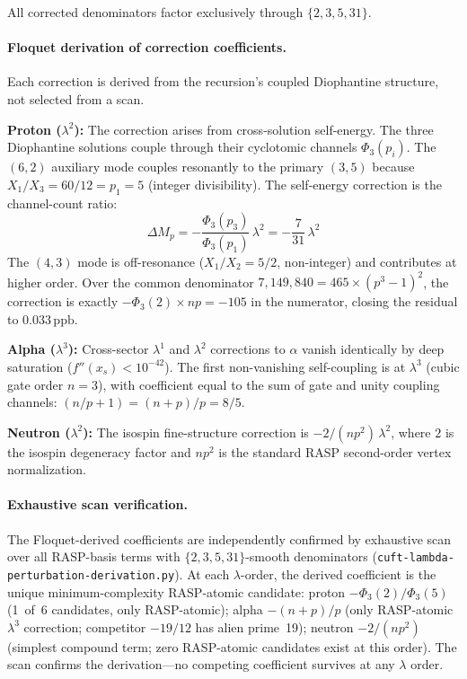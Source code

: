 \documentclass[12pt,a4paper]{article}
\theoremstyle{definition}
\newcommand{\Phithree}{\Phi_3}
\newcommand{\ppb}{\,\mathrm{ppb}}
\begin{document}
All corrected denominators factor exclusively through $\{2, 3, 5, 31\}$.

\paragraph{Floquet derivation of correction coefficients.}
Each correction is derived from the recursion's coupled Diophantine
structure, not selected from a scan.

\textbf{Proton ($\lambda^2$):} The correction arises from cross-solution
self-energy. The three Diophantine solutions couple through their
cyclotomic channels $\Phithree(p_i)$. The $(6,2)$ auxiliary mode
couples resonantly to the primary $(3,5)$ because
$X_1/X_3 = 60/12 = p_1 = 5$ (integer divisibility). The self-energy
correction is the channel-count ratio:
\[
  \Delta M_p = -\frac{\Phithree(p_3)}{\Phithree(p_1)}\,\lambda^2
  = -\frac{7}{31}\,\lambda^2
\]
The $(4,3)$ mode is off-resonance ($X_1/X_2 = 5/2$, non-integer) and
contributes at higher order. Over the common denominator $7{,}149{,}840
= 465 \times (p^3{-}1)^2$, the correction is exactly
$-\Phithree(2) \times np = -105$ in the numerator, closing the residual
to $0.033\ppb$.

\textbf{Alpha ($\lambda^3$):} Cross-sector $\lambda^1$ and $\lambda^2$
corrections to $\alpha$ vanish identically by deep saturation
($f''(x_s) < 10^{-42}$). The first non-vanishing self-coupling is at
$\lambda^3$ (cubic gate order $n = 3$), with coefficient equal to the
sum of gate and unity coupling channels:
$(n/p + 1) = (n{+}p)/p = 8/5$.

\textbf{Neutron ($\lambda^2$):} The isospin fine-structure correction is
$-2/(np^2)\,\lambda^2$, where $2$ is the isospin degeneracy factor and
$np^2$ is the standard RASP second-order vertex normalization.

\paragraph{Exhaustive scan verification.}
The Floquet-derived coefficients are independently confirmed by
exhaustive scan over all RASP-basis terms with $\{2,3,5,31\}$-smooth
denominators (\texttt{cuft-lambda-perturbation-derivation.py}). At each
$\lambda$-order, the derived coefficient is the unique minimum-complexity
RASP-atomic candidate: proton $-\Phithree(2)/\Phithree(5)$ (1~of~6
candidates, only RASP-atomic); alpha $-(n{+}p)/p$ (only RASP-atomic
$\lambda^3$ correction; competitor $-19/12$ has alien prime~19); neutron
$-2/(np^2)$ (simplest compound term; zero RASP-atomic candidates exist
at this order). The scan confirms the derivation---no competing
coefficient survives at any $\lambda$ order.
\end{document}
